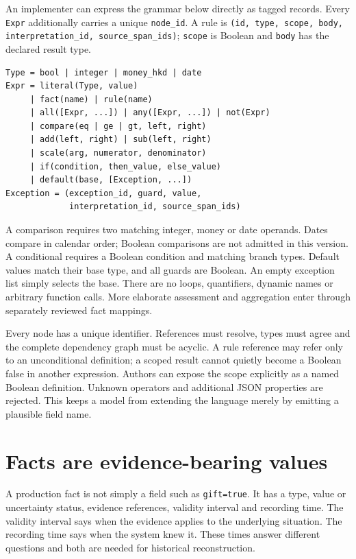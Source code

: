 
An implementer can express the grammar below directly as tagged records. Every
\texttt{Expr} additionally carries a unique \texttt{node\_id}. A rule is
\texttt{(id, type, scope, body, interpretation\_id, source\_span\_ids)};
\texttt{scope} is Boolean and \texttt{body} has the declared result type.
\begin{lstlisting}[caption={Complete operator grammar for RuleIR 0.1; repeated arguments are ordered. The Java demonstration implements a stated subset.}]
Type = bool | integer | money_hkd | date
Expr = literal(Type, value)
     | fact(name) | rule(name)
     | all([Expr, ...]) | any([Expr, ...]) | not(Expr)
     | compare(eq | ge | gt, left, right)
     | add(left, right) | sub(left, right)
     | scale(arg, numerator, denominator)
     | if(condition, then_value, else_value)
     | default(base, [Exception, ...])
Exception = (exception_id, guard, value,
             interpretation_id, source_span_ids)
\end{lstlisting}
A comparison requires two matching integer, money or date operands. Dates
compare in calendar order; Boolean comparisons are not admitted in this version.
A conditional requires a Boolean condition and matching branch types. Default
values match their base type, and all guards are Boolean. An empty exception
list simply selects the base. There are no loops, quantifiers, dynamic names or
arbitrary function calls. More elaborate assessment and aggregation enter
through separately reviewed fact mappings.

Every node has a unique identifier. References must resolve, types must agree
and the complete dependency graph must be acyclic. A rule reference may refer
only to an unconditional definition; a scoped result cannot quietly become a
Boolean false in another expression. Authors can expose the scope explicitly
as a named Boolean definition. Unknown operators and additional JSON properties
are rejected. This keeps a model from extending the language merely by emitting
a plausible field name.

\section{Facts are evidence-bearing values}
\label{merge:M07:01}


A production fact is not simply a field such as \texttt{gift=true}. It has a type,
value or uncertainty status, evidence references, validity interval and recording
time. The validity interval says when the evidence applies to the underlying
situation. The recording time says when the system knew it. These times answer
different questions and both are needed for historical reconstruction.

